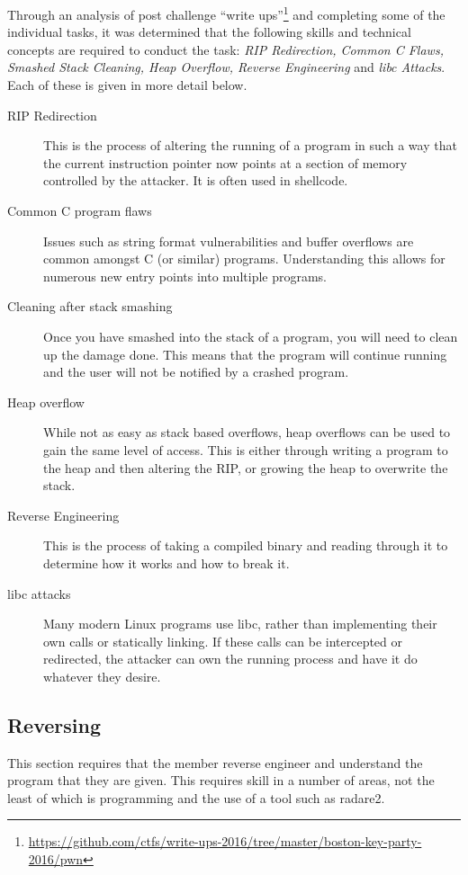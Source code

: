 \documentclass[a4paper,11pt]{report}
\begin{document}
			Through an analysis of post challenge ``write ups''\footnote{\url{https://github.com/ctfs/write-ups-2016/tree/master/boston-key-party-2016/pwn}}
			and completing some of the individual tasks, 
			it was determined that the following skills and technical concepts are required to conduct the task: 
			\textit{RIP Redirection, Common C Flaws, Smashed Stack Cleaning, Heap Overflow, Reverse Engineering} and \textit{libc Attacks}.
			Each of these is given in more detail below. 
			\begin{description}
				\item[RIP Redirection] 
					This is the process of altering the running of a program in such a way that the current instruction pointer now points at a section of memory controlled by the attacker. 
					It is often used in shellcode. 
				\item[Common C program flaws] 
					Issues such as string format vulnerabilities and buffer overflows are common amongst C (or similar) programs. 
					Understanding this allows for numerous new entry points into multiple programs. 
				\item[Cleaning after stack smashing] 
					Once you have smashed into the stack of a program, you will need to clean up the damage done. 
					This means that the program will continue running and the user will not be notified by a crashed program. 
				\item[Heap overflow] 
					While not as easy as stack based overflows, heap overflows can be used to gain the same level of access. 
					This is either through writing a program to the heap and then altering the RIP, or growing the heap to overwrite the stack. 
				\item[Reverse Engineering]
					This is the process of taking a compiled binary and reading through it to determine how it works and how to break it. 
				\item[libc attacks] 
					Many modern Linux programs use libc, rather than implementing their own calls or statically linking. 
					If these calls can be intercepted or redirected, the attacker can own the running process and have it do whatever they desire. 
			\end{description}
		\subsection{Reversing}
			This section requires that the member reverse engineer and understand the program that they are given. 
			This requires skill in a number of areas, not the least of which is programming and the use of a tool such as radare2. 
\end{document}
